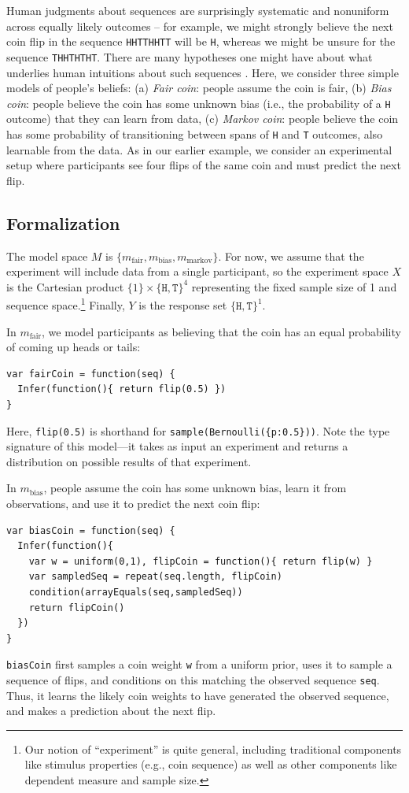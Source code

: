 \documentclass{article}
\begin{document}
Human judgments about sequences are surprisingly systematic and nonuniform across equally likely outcomes -- for example, we might strongly believe the next coin flip in the sequence \lstinline{HHTTHHTT} will be \lstinline{H}, whereas we might be unsure for the sequence \lstinline{THHTHTHT}.
There are many hypotheses one might have about what underlies human intuitions about such sequences \cite{goodfellow38:jep, falk81:pme, Griffiths2004_nips}.
Here, we consider three simple models of people's beliefs: (a) \emph{Fair coin}: people assume the coin is fair, (b) \emph{Bias coin}: people believe the coin has some unknown bias (i.e., the probability of a \lstinline{H} outcome) that they can learn from data, (c) \emph{Markov coin}: people believe the coin has some probability of transitioning between spans of \lstinline{H} and \lstinline{T} outcomes, also learnable from the data.
As in our earlier example, we consider an experimental setup where participants see four flips of the same coin and must predict the next flip.

\subsection{Formalization}

The model space $M$ is $\{m_{\text{fair}}, m_{\text{bias}}, m_{\text{markov}}\}$.
For now, we assume that the experiment will include data from a single participant, so the experiment space $X$ is the Cartesian product $\{1\} \times \{\texttt{H}, \texttt{T}\}^4$ representing the fixed sample size of 1 and sequence space.\footnote{Our notion of ``experiment'' is quite general, including traditional components like stimulus properties (e.g., coin sequence) as well as other components like dependent measure and sample size.}
Finally, $Y$ is the response set $\{\texttt{H}, \texttt{T}\}^1$.

In $m_{\text{fair}}$, we model participants as believing that the coin has an equal probability of coming up heads or tails:
\begin{lstlisting}[upquote=true]
var fairCoin = function(seq) {
  Infer(function(){ return flip(0.5) })
}
\end{lstlisting}
Here, \lstinline{flip(0.5)} is shorthand for \lstinline|sample(Bernoulli({p:0.5}))|.
Note the type signature of this model---it takes as input an experiment and returns a distribution on possible results of that experiment.

In $m_{\text{bias}}$, people assume the coin has some unknown bias, learn it from observations, and use it to predict the next coin flip:
\begin{lstlisting}[upquote=true]
var biasCoin = function(seq) {
  Infer(function(){
    var w = uniform(0,1), flipCoin = function(){ return flip(w) }
    var sampledSeq = repeat(seq.length, flipCoin)
    condition(arrayEquals(seq,sampledSeq))
    return flipCoin()
  })
}
\end{lstlisting}
\lstinline{biasCoin} first samples a coin weight \lstinline{w} from a uniform prior, uses it to sample a sequence of flips, and conditions on this matching the observed sequence \lstinline{seq}.
Thus, it learns the likely coin weights to have generated the observed sequence, and makes a prediction about the next flip.
\end{document}
